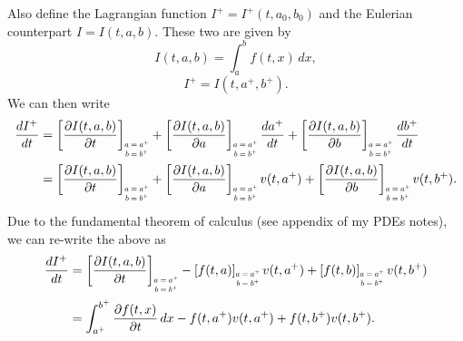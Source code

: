 \documentclass[oneside,a4paper,11pt]{report}
\begin{document}
Also define the Lagrangian function $I^+ = I^+(t,a_0,b_0)$ and the Eulerian counterpart $I = I(t,a,b)$. These two are given by 
\begin{equation}
    I(t,a,b) = \int_a^b f(t,x) \, dx,
\end{equation}
\begin{equation}
    I^+ = I(t,a^+,b^+).
\end{equation}
We can then write
\begin{align}
    \frac{dI^+}{dt} &= \left [ \frac{\partial I(t,a,b)}{\partial t} \right ]_{\scaleto{\begin{matrix} a=a^+ \\b=b^+ \end{matrix}}{15pt}} + \left [ \frac{\partial I(t,a,b)}{\partial a} \right ]_{\scaleto{\begin{matrix} a=a^+ \\b=b^+ \end{matrix}}{15pt}} \frac{d a^+}{dt} + \left [ \frac{\partial I(t,a,b)}{\partial b} \right ]_{\scaleto{\begin{matrix} a=a^+ \\b=b^+ \end{matrix}}{15pt}} \frac{db^+}{dt} \\
    &= \left [ \frac{\partial I(t,a,b)}{\partial t} \right ]_{\scaleto{\begin{matrix} a=a^+ \\b=b^+ \end{matrix}}{15pt}} + \left [ \frac{\partial I(t,a,b)}{\partial a} \right ]_{\scaleto{\begin{matrix} a=a^+ \\b=b^+ \end{matrix}}{15pt}} v(t,a^+) + \left [ \frac{\partial I(t,a,b)}{\partial b}\right ]_{\scaleto{\begin{matrix} a=a^+ \\b=b^+ \end{matrix}}{15pt}} v(t,b^+).
\end{align}
Due to the fundamental theorem of calculus (see appendix of my PDEs notes), we can re-write the above as
\begin{align}
    \frac{dI^+}{dt} &= \left [ \frac{\partial I(t,a,b)}{\partial t} \right ]_{\scaleto{\begin{matrix} a=a^+ \\b=b^+ \end{matrix}}{15pt}} -\left [ f(t,a) \right ]_{\scaleto{\begin{matrix} a=a^+ \\b=b^+ \end{matrix}}{15pt}} v(t,a^+) + \left [ f(t,b) \right ]_{\scaleto{\begin{matrix} a=a^+ \\b=b^+ \end{matrix}}{15pt}} v(t,b^+) \nonumber \\
    &= \int_{a^+}^{b^+} \frac{\partial f(t,x)}{\partial t} \, dx - f(t,a^+) v(t,a^+) + f(t,b^+) v(t,b^+).
\end{align}
\end{document}
